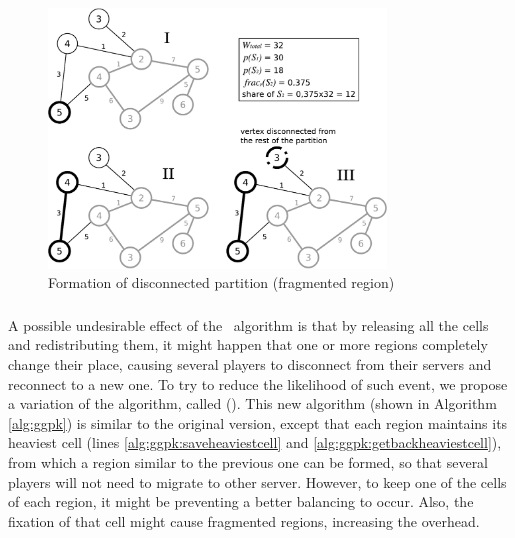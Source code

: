 \begin{figure}
\centering
\includegraphics[width=0.8\textwidth]{images/compressed}
\caption{Formation of disconnected partition (fragmented region)}
\label{fig:compressed}
\end{figure}

\subsubsection{\ggpk} %

A possible undesirable effect of the \ggp\ algorithm is that by releasing all the cells and redistributing them, it might happen that one or more regions completely change their place, causing several players to disconnect from their servers and reconnect to a new one. To try to reduce the likelihood of such event, we propose a variation of the algorithm, called \textbf{\ggpk} (\ggpkmeaning). This new algorithm (shown in Algorithm \ref{alg:ggpk}) is similar to the original version, except that each region maintains its heaviest cell (lines \ref{alg:ggpk:saveheaviestcell} and \ref{alg:ggpk:getbackheaviestcell}), from which a region similar to the previous one can be formed, so that several players will not need to migrate to other server. However, to keep one of the cells of each region, it might be preventing a better balancing to occur. Also, the fixation of that cell might cause fragmented regions, increasing the overhead.

